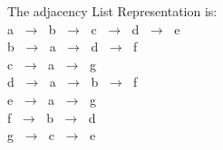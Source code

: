 \documentclass{article}
\begin{document}
\indent \indent The adjacency List Representation is: \\
\indent \indent \indent a $\; \longrightarrow \; $ b $\; \longrightarrow \;$ c $\; \longrightarrow \;$ d $\; \longrightarrow \;$ e \\
\indent \indent \indent b $\; \longrightarrow \; $ a $\; \longrightarrow \;$ d $\; \longrightarrow \;$ f \\
\indent \indent \indent c $\; \longrightarrow \; $ a $\; \longrightarrow \;$ g \\
\indent \indent \indent d $\; \longrightarrow \; $ a $\; \longrightarrow \;$ b $\; \longrightarrow \;$ f \\
\indent \indent \indent e $\; \longrightarrow \; $ a $\; \longrightarrow \;$ g \\
\indent \indent \indent f $\; \longrightarrow \; $ b $\; \longrightarrow \;$ d \\
\indent \indent \indent g $\; \longrightarrow \; $ c $\; \longrightarrow \;$ e 
\end{document}
